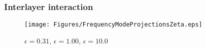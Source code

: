 \subsubsection{Interlayer interaction}
\onecolumngrid

\begin{figure}[H]
    \centering
    \texttt{[image: Figures/FrequencyModeProjectionsZeta.eps]}
    \caption{$\epsilon=0.31$, $\epsilon=1.00$, $\epsilon=10.0$}
    \label{}
\end{figure}
\twocolumngrid